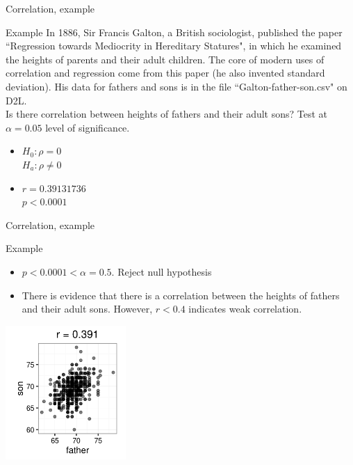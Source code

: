 \documentclass[xcolor=table, handout]{beamer}
\begin{document}
\begin{frame}{Correlation, example}
\begin{exampleblock}{Example}
In 1886, Sir Francis Galton, a British sociologist, published the paper ``Regression towards Mediocrity in Hereditary Statures", in which he examined the heights of parents and their adult children. The core of modern uses of correlation and regression come from this paper (he also invented standard deviation). His data for fathers and sons is in the file ``Galton-father-son.csv" on D2L.\\
\medskip
Is there correlation between heights of fathers and their adult sons? Test at $\alpha = 0.05$ level of significance.
\begin{itemize}
\pause\item $H_0: \rho = 0$\\$H_a: \rho \ne 0$ 
\pause\item $r = 0.39131736$ \\ $p < 0.0001$
\end{itemize} 
\end{exampleblock}
\end{frame}

\begin{frame}{Correlation, example}
\begin{exampleblock}{Example}
\begin{itemize}
\item $p < 0.0001 < \alpha = 0.5$. Reject null hypothesis
\item There is evidence that there is a correlation between the heights of fathers and their adult sons. However, $r < 0.4$ indicates weak correlation.
\end{itemize} 
\end{exampleblock}
\medskip
{\centering
\includegraphics[width=1.8in]{../images/ch10_cor_galton}
\par}
\end{frame}
\end{document}
